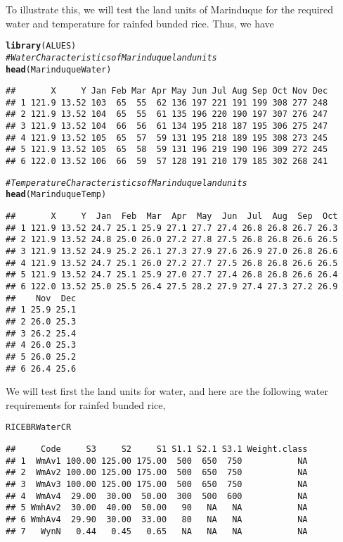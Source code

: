 \documentclass[11pt,fleqn]{article}\usepackage[]{graphicx}\usepackage[]{color}
\makeatletter
\newcommand{\hlcom}[1]{\textcolor[rgb]{0.678,0.584,0.686}{\textit{#1}}}%
\newcommand{\hlstd}[1]{\textcolor[rgb]{0.345,0.345,0.345}{#1}}%
\newcommand{\hlkwd}[1]{\textcolor[rgb]{0.737,0.353,0.396}{\textbf{#1}}}%
\newenvironment{kframe}{%
 \def\at@end@of@kframe{}%
 \ifinner\ifhmode%
  \def\at@end@of@kframe{\end{minipage}}%
  \begin{minipage}{\columnwidth}%
 \fi\fi%
 \def\FrameCommand##1{\hskip\@totalleftmargin \hskip-\fboxsep
 \colorbox{shadecolor}{##1}\hskip-\fboxsep
     \hskip-\linewidth \hskip-\@totalleftmargin \hskip\columnwidth}%
 \MakeFramed {\advance\hsize-\width
   \@totalleftmargin\z@ \linewidth\hsize
   \@setminipage}}%
 {\par\unskip\endMakeFramed%
 \at@end@of@kframe}
\newenvironment{knitrout}{}{} %
\makeatother
\begin{document}
To illustrate this, we will test the land units of Marinduque for the required water and temperature for rainfed bunded rice. Thus, we have
\begin{knitrout}
\color{fgcolor}\begin{kframe}
\begin{alltt}
\hlkwd{library}\hlstd{(ALUES)}
\hlcom{# Water Characteristics of Marinduque land units}
\hlkwd{head}\hlstd{(MarinduqueWater)}
\end{alltt}
\begin{verbatim}
##       X     Y Jan Feb Mar Apr May Jun Jul Aug Sep Oct Nov Dec
## 1 121.9 13.52 103  65  55  62 136 197 221 191 199 308 277 248
## 2 121.9 13.52 104  65  55  61 135 196 220 190 197 307 276 247
## 3 121.9 13.52 104  66  56  61 134 195 218 187 195 306 275 247
## 4 121.9 13.52 105  65  57  59 131 195 218 189 195 308 273 245
## 5 121.9 13.52 105  65  58  59 131 196 219 190 196 309 272 245
## 6 122.0 13.52 106  66  59  57 128 191 210 179 185 302 268 241
\end{verbatim}
\begin{alltt}
\hlcom{# Temperature Characteristics of Marinduque land units}
\hlkwd{head}\hlstd{(MarinduqueTemp)}
\end{alltt}
\begin{verbatim}
##       X     Y  Jan  Feb  Mar  Apr  May  Jun  Jul  Aug  Sep  Oct
## 1 121.9 13.52 24.7 25.1 25.9 27.1 27.7 27.4 26.8 26.8 26.7 26.3
## 2 121.9 13.52 24.8 25.0 26.0 27.2 27.8 27.5 26.8 26.8 26.6 26.5
## 3 121.9 13.52 24.9 25.2 26.1 27.3 27.9 27.6 26.9 27.0 26.8 26.6
## 4 121.9 13.52 24.7 25.1 26.0 27.2 27.7 27.5 26.8 26.8 26.6 26.5
## 5 121.9 13.52 24.7 25.1 25.9 27.0 27.7 27.4 26.8 26.8 26.6 26.4
## 6 122.0 13.52 25.0 25.5 26.4 27.5 28.2 27.9 27.4 27.3 27.2 26.9
##    Nov  Dec
## 1 25.9 25.1
## 2 26.0 25.3
## 3 26.2 25.4
## 4 26.0 25.3
## 5 26.0 25.2
## 6 26.4 25.6
\end{verbatim}
\end{kframe}
\end{knitrout}
We will test first the land units for water, and here are the following water requirements for rainfed bunded rice,
\begin{knitrout}
\color{fgcolor}\begin{kframe}
\begin{alltt}
\hlstd{RICEBRWaterCR}
\end{alltt}
\begin{verbatim}
##     Code     S3     S2     S1 S1.1 S2.1 S3.1 Weight.class
## 1  WmAv1 100.00 125.00 175.00  500  650  750           NA
## 2  WmAv2 100.00 125.00 175.00  500  650  750           NA
## 3  WmAv3 100.00 125.00 175.00  500  650  750           NA
## 4  WmAv4  29.00  30.00  50.00  300  500  600           NA
## 5 WmhAv2  30.00  40.00  50.00   90   NA   NA           NA
## 6 WmhAv4  29.90  30.00  33.00   80   NA   NA           NA
## 7   WynN   0.44   0.45   0.65   NA   NA   NA           NA
\end{verbatim}
\end{kframe}
\end{knitrout}
\end{document}
